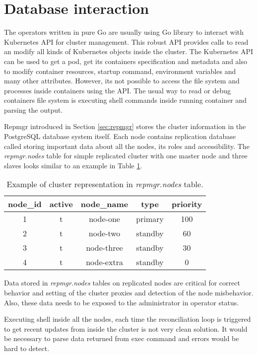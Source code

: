 \documentclass[
  digital, %
  twoside, %
  table,   %
  lof,     %
  lot,     %
]{fithesis3}
\begin{document}
\section{Database interaction}
The operators written in pure Go are usually using Go library to interact with Kubernetes API \cite{k8s-api} for cluster management. This robust API provides calls to read an modify all kinds of Kubernetes objects inside the cluster. The Kubernetes API can be used to get a pod, get its containers specification and metadata and also to modify container resources, startup command, environment variables and many other attributes. However, its not possible to access the file system and processes inside containers using the API. The usual way to read or debug containers file system is executing shell commands inside running container and parsing the output.

Repmgr introduced in Section \ref{sec:repmgr} stores the cluster information in the PostgreSQL database system itself. Each node contains replication database called  storing important data about all the nodes, its roles and accessibility. The \textit{repmgr.nodes} table for simple replicated cluster with one master node and three slaves looks similar to an example in Table \ref{table:repmgr_nodes}.

\begin{table}[ht!]
\centering
\begin{tabular}{|c c c c c|}
 \hline
 node\_id & active & node\_name & type & priority \\ [0.5ex]
 \hline
 1 & t & node-one & primary & 100 \\

 2 & t & node-two & standby & 60 \\

 3 & t & node-three & standby & 30 \\

 4 & t & node-extra & standby & 0 \\ [1ex]
 \hline
\end{tabular}
\caption{Example of cluster representation in \textit{repmgr.nodes} table.}
\label{table:repmgr_nodes}
\end{table}

Data stored in \textit{repmgr.nodes} tables on replicated nodes are critical for correct behavior and setting of the cluster proxies and detection of the node misbehavior. Also, these data needs to be exposed to the administrator in operator status.

Executing shell inside all the nodes, each time the reconciliation loop is triggered to get recent updates from inside the cluster is not very clean solution. It would be necessary to parse data returned from exec command and errors would be hard to detect.
\end{document}
